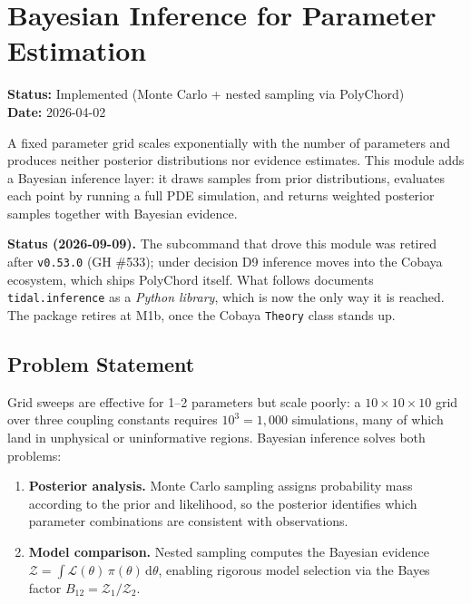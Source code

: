 
\section{Bayesian Inference for Parameter Estimation}
\label{sec:inference}

\textbf{Status:} Implemented (Monte Carlo + nested sampling via PolyChord) \\
\textbf{Date:} 2026-04-02

A fixed parameter grid scales exponentially with the number of parameters and
produces neither posterior distributions nor evidence estimates.  This module
adds a Bayesian inference layer: it draws samples from prior distributions,
evaluates each point by running a full PDE simulation, and returns weighted
posterior samples together with Bayesian evidence.

\textbf{Status (2026-09-09).} The subcommand that drove this module was retired
after \texttt{v0.53.0} (GH \#533); under decision D9 inference moves into the
Cobaya ecosystem, which ships PolyChord itself.  What follows documents
\texttt{tidal.inference} as a \emph{Python library}, which is now the only way
it is reached.  The package retires at M1b, once the Cobaya \texttt{Theory}
class stands up.

\subsection{Problem Statement}
\label{sec:inference-problem}

Grid sweeps are effective for 1--2 parameters but scale poorly: a
$10\times10\times10$ grid over three coupling constants requires $10^3 =
1{,}000$ simulations, many of which land in unphysical or uninformative
regions.  Bayesian inference solves both problems:

\begin{enumerate}
  \item \textbf{Posterior analysis.}  Monte Carlo sampling assigns probability
    mass according to the prior and likelihood, so the posterior identifies
    which parameter combinations are consistent with observations.

  \item \textbf{Model comparison.}  Nested sampling computes the Bayesian
    evidence $\mathcal{Z} = \int \mathcal{L}(\theta)\,\pi(\theta)\,\mathrm{d}\theta$,
    enabling rigorous model selection via the Bayes factor
    $B_{12} = \mathcal{Z}_1/\mathcal{Z}_2$.
\end{enumerate}


